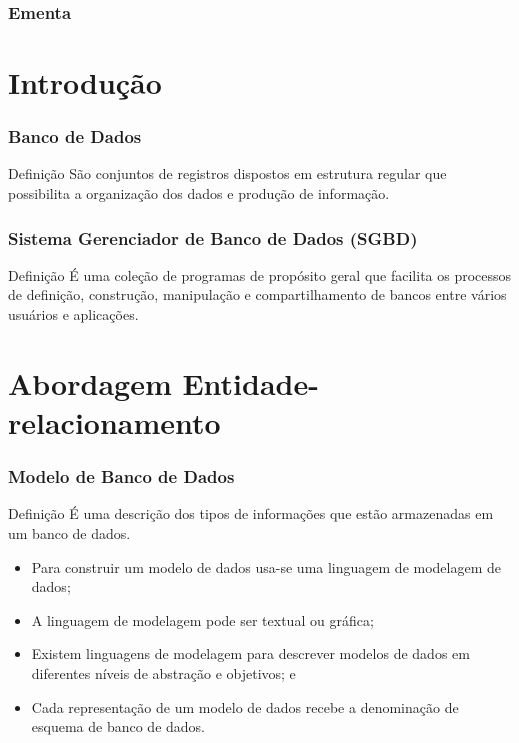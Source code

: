 \documentclass{beamer}
\begin{document}
\begin{frame}
	\frametitle{Ementa}
  	\tableofcontents
\end{frame}


\section{Introdução}

\begin{frame}
\frametitle{Banco de Dados}

\begin{block}{Definição}
	São conjuntos de registros dispostos em estrutura regular que possibilita a
	organização dos dados e produção de informação.
\end{block}
\end{frame}

\begin{frame}
\frametitle{Sistema Gerenciador de Banco de Dados (SGBD)}

\begin{block}{Definição}
É uma coleção de programas de propósito geral que facilita os processos de
definição, construção, manipulação e compartilhamento de bancos entre
vários usuários e aplicações.
\end{block}
\end{frame}

\section{Abordagem Entidade-relacionamento}

\begin{frame}
\frametitle{Modelo de 	Banco de Dados}

\begin{block}{Definição}
	É uma descrição dos tipos de informações que estão armazenadas em um
	banco de dados.
\end{block} \vfill

\begin{itemize}
	\item Para construir um modelo de dados usa-se uma linguagem de
	modelagem de dados;
	\item A linguagem de modelagem pode ser textual ou gráfica;
	\item Existem linguagens de modelagem para descrever modelos de dados
	em diferentes níveis de abstração e objetivos; e
	\item Cada representação de um modelo de dados recebe a denominação de
	esquema de banco de dados.
\end{itemize}
\end{frame}
\end{document}
